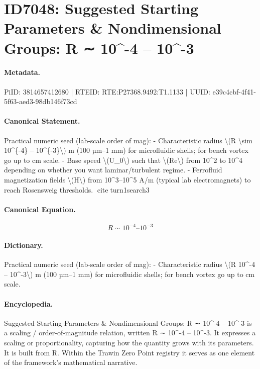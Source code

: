 \section*{ID7048: Suggested Starting Parameters \& Nondimensional Groups: R ∼ 10\textasciicircum{}-4 – 10\textasciicircum{}-3}
\paragraph{Metadata.}
PiID: 3814657412680 | RTEID: RTE:P27368.9492:T1.1133 | UUID: e39c4cbf-4f41-5f63-aed3-98db146f73cd

\paragraph{Canonical Statement.}
Practical numeric seed (lab-scale order of mag): - Characteristic radius \textbackslash{}(R \textbackslash{}sim 10\textasciicircum{}\{-4\} – 10\textasciicircum{}\{-3\}\textbackslash{}) m (100 µm–1 mm) for microfluidic shells; for bench vortex go up to cm scale. - Base speed \textbackslash{}(U\_0\textbackslash{}) such that \textbackslash{}(Re\textbackslash{}) from 10\textasciicircum{}2 to 10\textasciicircum{}4 depending on whether you want laminar/turbulent regime. - Ferrofluid magnetization fields \textbackslash{}(H\textbackslash{}) from 10\textasciicircum{}3–10\textasciicircum{}5 A/m (typical lab electromagnets) to reach Rosensweig thresholds. citeturn1search3

\paragraph{Canonical Equation.}
\[
R \sim 10^{-4} – 10^{-3}
\]

\paragraph{Dictionary.}
Practical numeric seed (lab-scale order of mag): - Characteristic radius \textbackslash{}(R 10\textasciicircum{}-4 – 10\textasciicircum{}-3\textbackslash{}) m (100 µm–1 mm) for microfluidic shells; for bench vortex go up to cm scale.

\paragraph{Encyclopedia.}
Suggested Starting Parameters \& Nondimensional Groups: R ∼ 10\textasciicircum{}-4 – 10\textasciicircum{}-3 is a scaling / order-of-magnitude relation, written R ∼ 10\textasciicircum{}-4 – 10\textasciicircum{}-3. It expresses a scaling or proportionality, capturing how the quantity grows with its parameters. It is built from R. Within the Trawin Zero Point registry it serves as one element of the framework's mathematical narrative.
